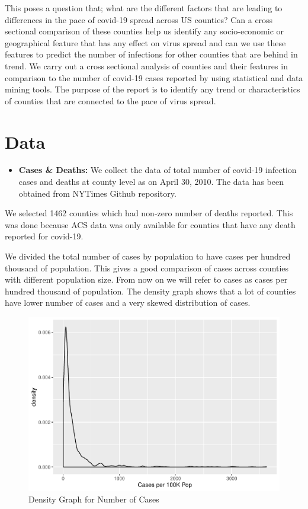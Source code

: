 \documentclass[
]{article}
\providecommand{\tightlist}{%
  \setlength{\itemsep}{0pt}\setlength{\parskip}{0pt}}
\begin{document}
This poses a question that; what are the different factors that are
leading to differences in the pace of covid-19 spread across US
counties? Can a cross sectional comparison of these counties help us
identify any socio-economic or geographical feature that has any effect
on virus spread and can we use these features to predict the number of
infections for other counties that are behind in trend. We carry out a
cross sectional analysis of counties and their features in comparison to
the number of covid-19 cases reported by using statistical and data
mining tools. The purpose of the report is to identify any trend or
characteristics of counties that are connected to the pace of virus
spread.

\hypertarget{data}{%
\section{Data}\label{data}}

\begin{itemize}
\tightlist
\item
  \textbf{Cases \& Deaths:} We collect the data of total number of
  covid-19 infection cases and deaths at county level as on April 30,
  2010. The data has been obtained from NYTimes Github repository.
\end{itemize}

We selected 1462 counties which had non-zero number of deaths reported.
This was done because ACS data was only available for counties that have
any death reported for covid-19.

We divided the total number of cases by population to have cases per
hundred thousand of population. This gives a good comparison of cases
across counties with different population size. From now on we will
refer to cases as cases per hundred thousand of population. The density
graph shows that a lot of counties have lower number of cases and a very
skewed distribution of cases.

\begin{figure}
\centering
\includegraphics{covid_tree_analysis_files/figure-latex/unnamed-chunk-3-1.pdf}
\caption{Density Graph for Number of Cases}
\end{figure}
\end{document}
